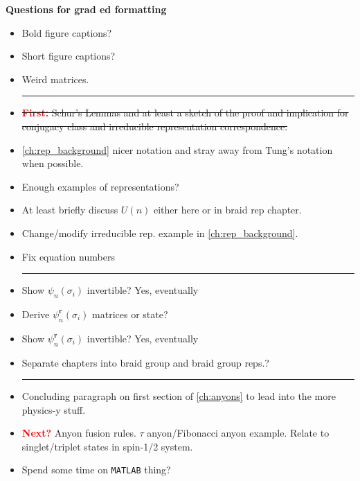 \textbf{Questions for grad ed formatting}
\begin{itemize}
    \item Bold figure captions?
    \item Short figure captions?
    \item Weird matrices.

    \begin{center}\rule{.85\textwidth}{0.65pt}\end{center}

    \item \sout{\textbf{\textcolor{red}{First:}} Schur's Lemmas and at least a sketch of the proof and implication for conjugacy class and irreducible representation correspondence.}
    \item \cref{ch:rep_background} nicer notation and stray away from Tung's notation when possible.
    \item Enough examples of representations?
    \item At least briefly discuss $U(n)$ either here or in braid rep chapter.
    \item Change/modify irreducible rep. example in \cref{ch:rep_background}.
    \item Fix equation numbers
    
    \begin{center}\rule{.85\textwidth}{0.65pt}\end{center}
    
    \item Show $\psi_n(\sigma_i)$ invertible? Yes, eventually
    \item Derive $\psi_n^\textbf{r}(\sigma_i)$ matrices or state?
    \item Show $\psi_n^\textbf{r}(\sigma_i)$ invertible? Yes, eventually
    \item Separate chapters into braid group and braid group reps.?
    
    \begin{center}\rule{.85\textwidth}{0.65pt}\end{center}
    
    \item Concluding paragraph on first section of \cref{ch:anyons} to lead into the more physics-y stuff.
    \item \textbf{\textcolor{red}{Next?}} Anyon fusion rules. $\tau$ anyon/Fibonacci anyon example. Relate to singlet/triplet states in spin-1/2 system.
    \item Spend some time on \texttt{MATLAB} thing?


\end{itemize}
